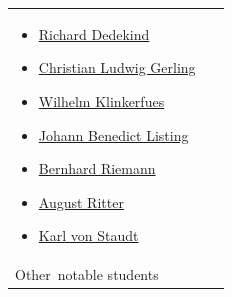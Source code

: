\begin{longtable}[]{@{}
  >{\raggedright\arraybackslash}p{}
  >{\raggedright\arraybackslash}p{}@{}}
\begin{minipage}[t]{\linewidth}
\begin{itemize}
\tightlist
\item
  \href{https://en.wikipedia.org/wiki/Richard_Dedekind}{Richard Dedekind}
\item
  \href{https://en.wikipedia.org/wiki/Christian_Ludwig_Gerling}{Christian Ludwig Gerling}
\item
  \href{https://en.wikipedia.org/wiki/Wilhelm_Klinkerfues}{Wilhelm Klinkerfues}
\item
  \href{https://en.wikipedia.org/wiki/Johann_Benedict_Listing}{Johann Benedict Listing}
\item
  \href{https://en.wikipedia.org/wiki/Bernhard_Riemann}{Bernhard Riemann}
\item
  \href{https://en.wikipedia.org/wiki/August_Ritter_(civil_engineer)}{August Ritter}
\item
  \href{https://en.wikipedia.org/wiki/Karl_von_Staudt}{Karl von Staudt}
\end{itemize}
\end{minipage} \\
Other{~}notable students & \begin{minipage}[t]{\linewidth}\raggedright
\emph{{~}}


\end{minipage}
\end{longtable}
